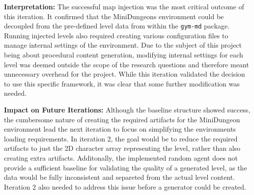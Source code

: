\textbf{Interpretation:} The successful map injection was the most critical outcome of this iteration.
It confirmed that the MiniDungeons environment could be decoupled from the pre-defined level data from within the \texttt{gym-md} package. Running injected levels also required creating various configuration files to manage internal settings of the environment. 
Due to the subject of this project being about procedural content generation, modifying internal settings for each level was deemed outside the scope of the research questions and therefore meant unnecessary overhead for the project.
While this iteration validated the decision to use this specific framework, it was clear that some further modification was needed.

\textbf{Impact on Future Iterations:} Although the baseline structure showed success, the cumbersome nature of creating the required artifacts for the MiniDungeon environment 
lead the next iteration to focus on simplifying the environments loading requirements. In iteration 2, the goal would be to reduce the required artifacts to just the 2D character array representing the level, rather than also creating extra artifacts.
Additonally, the implemented random agent does not provide a sufficient baseline for validating the quality of a generated level, as the data would be fully inconsistent and separeted from the actual level content. Iteration 2 also needed to address this issue before a generator could be created. 